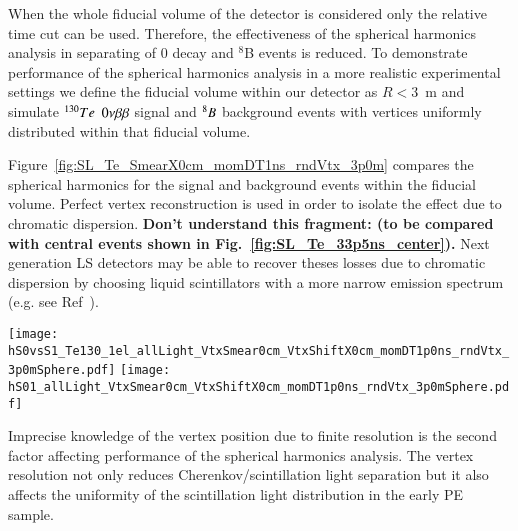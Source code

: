 When the whole fiducial volume of the detector is considered only the relative time cut can be used. Therefore, the effectiveness of the spherical harmonics analysis in separating of 0{\nbb} decay and $^{8}$B events is reduced. To demonstrate performance of the spherical harmonics analysis in a  more realistic experimental settings we define the fiducial volume within our detector as $R<3$~m and  simulate $^{130}Te$ $0\nu\beta\beta$ signal and $^{8}B$ background events with vertices uniformly distributed within that fiducial volume.

Figure~\ref{fig:SL_Te_SmearX0cm_momDT1ns_rndVtx_3p0m} compares the spherical harmonics for the signal and background events within the fiducial volume. Perfect vertex reconstruction is used in order to isolate the effect due to chromatic dispersion.   {\bf Don't understand this fragment: (to be compared with central events shown in Fig.~\ref{fig:SL_Te_33p5ns_center}).} Next generation LS detectors may be able to recover theses losses due to chromatic dispersion by choosing liquid scintillators with a more narrow emission spectrum (e.g. see Ref~\cite{LS_narrow_emission}).

\begin{figure*}[h]
  \centering
  \texttt{[image: hS0vsS1\_Te130\_1el\_allLight\_VtxSmear0cm\_VtxShiftX0cm\_momDT1p0ns\_rndVtx\_3p0mSphere.pdf]}
  \texttt{[image: hS01\_allLight\_VtxSmear0cm\_VtxShiftX0cm\_momDT1p0ns\_rndVtx\_3p0mSphere.pdf]}
  \caption{Spherical harmonics comparison between $^{130}$Te 0{\nbb}
    decay signal ($Q=2.529$~MeV) (\emph{red}) and $^{8}$B solar
    neutrinos background (\emph{blue}) for 1000 simulated
    events.Verticies are uniformly distributed within the fiducial
    volume, $R<3$~m. $^8$Be events are implemented as 2.529~MeV
    electrons with the initial momentum direction uniformly
    distributed within 4$\pi$ solid angle. Perfect vertex
    reconstruction - true vertex position is used. \emph{Left:} $S_0$
    versus $S_1$ scatter plot. Black dotted line is a linear fit of
    these 2D histograms. Variable $S_{01}$ is defined as a projection
    of 2D distribution onto this linear fit. \emph{Right:} $S_{01}$}
  \label{fig:SL_Te_SmearX0cm_momDT1ns_rndVtx_3p0m}
\end{figure*}


Imprecise knowledge of the vertex position due to finite resolution is
the second factor affecting performance of the spherical harmonics
analysis. The vertex resolution not only reduces Cherenkov/scintillation light separation but it also affects the uniformity of the scintillation light distribution in the early PE sample.

